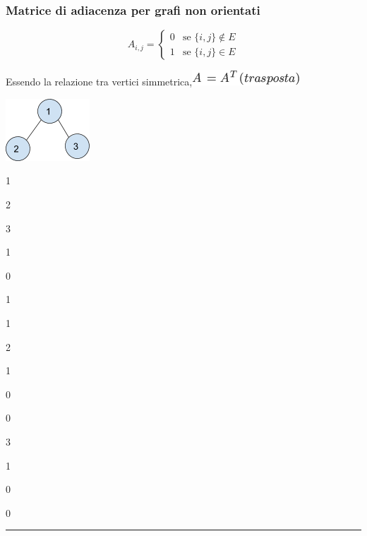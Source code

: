 \documentclass{article}
\begin{document}
{}

\hypertarget{h.iuwxcos21awu}{\subsubsection{\texorpdfstring{{Matrice di
adiacenza per grafi non
orientati}}{Matrice di adiacenza per grafi non orientati}}\label{h.iuwxcos21awu}}

\begin{equation}
A_{i,j} = 
\begin{cases}
0 & \mbox{se } \{i,j\} \notin E \\ 
1 & \mbox{se } \{i,j\} \in E
\end{cases}
\end{equation}


{Essendo la relazione tra vertici simmetrica,}\includegraphics{images/image390.png}

{}

{}

\protect\hypertarget{t.1db15af38187ce98dc87977567f42b70be1e9c99}{}{}\protect\hypertarget{t.38}{}{}

{\includegraphics{images/image535.png}}

{}

{1}

{2}

{3}

{1}

{0}

{1}

{1}

{2}

{1}

{0}

{0}

{3}

{1}

{0}

{0}

{}

{}

\begin{center}\rule{0.5\linewidth}{\linethickness}\end{center}
\end{document}
